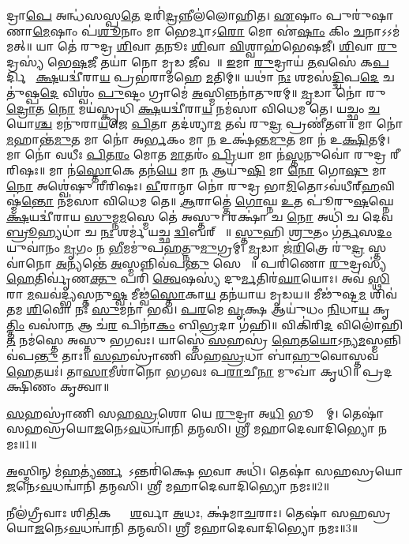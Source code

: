 𑌦𑍍𑌰𑌾\ul{𑌪𑍇} 𑌅𑌨𑍍𑌧॑𑌸𑌸𑍍𑌪\ul{𑌤𑍇} 𑌦𑌰𑌿॑\ul{𑌦𑍍𑌰}𑌨𑍍𑌨𑍀𑌲॑𑌲𑍋𑌹𑌿𑌤। \ul{𑌏}𑌷𑌾𑌂 𑌪𑍁𑌰𑍁॑𑌷𑌾𑌣𑌾\ul{𑌮𑍇}𑌷𑌾𑌂 𑌪॑\ul{𑌶𑍂}𑌨𑌾𑌂 𑌮𑌾 𑌭𑍇𑌰𑍍𑌮𑌾𑌽\ul{𑌰𑍋} 𑌮𑍋 𑌏॑\ul{𑌷𑌾𑌂} 𑌕𑌿𑌂 \ul{𑌚}𑌨𑌾𑌽𑌽𑌮॑𑌮𑌤𑍍॥ 𑌯𑌾 𑌤𑍇॑ 𑌰𑍁𑌦𑍍𑌰 \ul{𑌶𑌿}𑌵𑌾 \ul{𑌤}𑌨𑍂𑌃 \ul{𑌶𑌿}𑌵𑌾 \ul{𑌵𑌿}𑌶𑍍𑌵𑌾𑌹॑𑌭𑍇𑌷𑌜𑍀। \ul{𑌶𑌿}𑌵𑌾 \ul{𑌰𑍁}𑌦𑍍𑌰𑌸𑍍𑌯॑ 𑌭𑍇\ul{𑌷}𑌜𑍀 𑌤𑌯𑌾॑ 𑌨𑍋 𑌮𑍃𑌡 \ul{𑌜𑍀}𑌵𑌸𑍇᳚॥ \ul{𑌇}𑌮𑌾 \ul{𑌰𑍁}𑌦𑍍𑌰𑌾𑌯॑ \ul{𑌤}𑌵𑌸𑍇॑ 𑌕\ul{𑌪}𑌰𑍍𑌦𑌿𑌨𑍇᳚ \ul{𑌕𑍍𑌷}𑌯𑌦𑍍𑌵𑍀॑𑌰𑌾\ul{𑌯} 𑌪𑍍𑌰𑌭॑𑌰𑌾𑌮𑌹𑍇 \ul{𑌮}𑌤𑌿𑌮𑍍॥ 𑌯𑌥𑌾॑ \ul{𑌨𑌃} 𑌶𑌮𑌸॑\ul{𑌦𑍍𑌦𑍍𑌵𑌿}𑌪\ul{𑌦𑍇} 𑌚𑌤𑍁॑𑌷𑍍𑌪\ul{𑌦𑍇} 𑌵𑌿𑌶𑍍𑌵𑌂॑ \ul{𑌪𑍁}𑌷𑍍𑌟𑌂 𑌗𑍍𑌰𑌾𑌮𑍇॑ \ul{𑌅}𑌸𑍍𑌮𑌿𑌨𑍍𑌨𑌨𑌾॑𑌤𑍁𑌰𑌮𑍍॥ \ul{𑌮𑍃}𑌡𑌾 𑌨𑍋॑ 𑌰𑍁\ul{𑌦𑍍𑌰𑍋}𑌤 \ul{𑌨𑍋} 𑌮𑌯॑𑌸𑍍𑌕𑍃𑌧𑌿 \ul{𑌕𑍍𑌷}𑌯𑌦𑍍𑌵𑍀॑𑌰𑌾\ul{𑌯} 𑌨𑌮॑𑌸𑌾 𑌵𑌿𑌧𑍇𑌮 𑌤𑍇। 𑌯𑌚𑍍𑌛𑌂 \ul{𑌚} 𑌯𑍋\ul{𑌶𑍍𑌚} 𑌮𑌨𑍁॑𑌰𑌾\ul{𑌯}𑌜𑍇 \ul{𑌪𑌿}𑌤𑌾 𑌤𑌦॑𑌶𑍍𑌯𑌾\ul{𑌮} 𑌤𑌵॑ 𑌰𑍁\ul{𑌦𑍍𑌰} 𑌪𑍍𑌰𑌣𑍀॑𑌤𑍗॥ 𑌮𑌾 𑌨𑍋॑ \ul{𑌮}𑌹𑌾𑌨𑍍𑌤॑\ul{𑌮𑍁}𑌤 𑌮𑌾 𑌨𑍋॑ 𑌅\ul{𑌰𑍍𑌭}𑌕𑌂 𑌮𑌾 \ul{𑌨} 𑌉𑌕𑍍𑌷॑𑌨𑍍𑌤\ul{𑌮𑍁}𑌤 𑌮𑌾 𑌨॑ 𑌉\ul{𑌕𑍍𑌷𑌿}𑌤𑌮𑍍। 𑌮𑌾 𑌨𑍋॑ 𑌵𑌧𑍀𑌃 \ul{𑌪𑌿}𑌤\ul{𑌰𑌂} 𑌮𑍋𑌤 \ul{𑌮𑌾}𑌤𑌰𑌂॑ \ul{𑌪𑍍𑌰𑌿}𑌯𑌾 𑌮𑌾 𑌨॑\ul{𑌸𑍍𑌤}𑌨𑍁𑌵𑍋॑ 𑌰𑍁𑌦𑍍𑌰 𑌰𑍀𑌰𑌿𑌷𑌃॥ 𑌮𑌾 𑌨॑\ul{𑌸𑍍𑌤𑍋}𑌕𑍇 𑌤𑌨॑\ul{𑌯𑍇} 𑌮𑌾 \ul{𑌨} 𑌆𑌯𑍁॑\ul{𑌷𑌿} 𑌮𑌾 \ul{𑌨𑍋} 𑌗𑍋\ul{𑌷𑍁} 𑌮𑌾 \ul{𑌨𑍋} 𑌅𑌶𑍍𑌵𑍇॑𑌷𑍁 𑌰𑍀𑌰𑌿𑌷𑌃। \ul{𑌵𑍀}𑌰𑌾𑌨𑍍𑌮𑌾 𑌨𑍋॑ 𑌰𑍁𑌦𑍍𑌰 𑌭𑌾\ul{𑌮𑌿}𑌤𑍋𑌽𑌵॑𑌧𑍀𑌰𑍍‌\ul{𑌹}𑌵𑌿𑌷𑍍𑌮॑\ul{𑌨𑍍𑌤𑍋} 𑌨𑌮॑𑌸𑌾 𑌵𑌿𑌧𑍇𑌮 𑌤𑍇॥ \ul{𑌆}𑌰𑌾𑌤𑍍𑌤𑍇॑ \ul{𑌗𑍋}𑌘𑍍𑌨 \ul{𑌉}𑌤 𑌪𑍂॑𑌰𑍁\ul{𑌷}𑌘𑍍𑌨𑍇 \ul{𑌕𑍍𑌷}𑌯𑌦𑍍𑌵𑍀॑𑌰𑌾𑌯 \ul{𑌸𑍁}𑌮𑍍𑌨\ul{𑌮}𑌸𑍍𑌮𑍇 𑌤𑍇॑ 𑌅𑌸𑍍𑌤𑍁। 𑌰𑌕𑍍𑌷𑌾॑ 𑌚 \ul{𑌨𑍋} 𑌅𑌧𑌿॑ 𑌚 𑌦𑍇𑌵 \ul{𑌬𑍍𑌰𑍂}𑌹𑍍𑌯𑌧𑌾॑ 𑌚 \ul{𑌨𑌃} 𑌶𑌰𑍍𑌮॑ 𑌯𑌚𑍍𑌛 \ul{𑌦𑍍𑌵𑌿}𑌬𑌰𑍍‌𑌹𑌾𑌃᳚॥ \ul{𑌸𑍍𑌤𑍁}𑌹𑌿 \ul{𑌶𑍍𑌰𑍁}𑌤𑌂 𑌗॑\ul{𑌰𑍍𑌤}𑌸\ul{𑌦𑌂} 𑌯𑍁𑌵𑌾॑𑌨𑌂 \ul{𑌮𑍃}𑌗𑌂 𑌨 \ul{𑌭𑍀}𑌮𑌮𑍁॑𑌪\ul{𑌹}𑌤𑍍𑌨𑍁\ul{𑌮𑍁}𑌗𑍍𑌰𑌮𑍍। \ul{𑌮𑍃}𑌡𑌾 𑌜॑\ul{𑌰𑌿}𑌤𑍍𑌰𑍇 𑌰𑍁॑\ul{𑌦𑍍𑌰} 𑌸𑍍𑌤𑌵𑌾॑𑌨𑍋 \ul{𑌅}𑌨𑍍𑌯𑌨𑍍𑌤𑍇॑ \ul{𑌅}𑌸𑍍𑌮𑌨𑍍𑌨𑌿𑌵॑𑌪\ul{𑌨𑍍𑌤𑍁} 𑌸𑍇𑌨𑌾𑌃᳚॥ 𑌪𑌰𑌿॑𑌣𑍋 \ul{𑌰𑍁}𑌦𑍍𑌰𑌸𑍍𑌯॑ \ul{𑌹𑍇}𑌤𑌿𑌰𑍍𑌵𑍃॑𑌣\ul{𑌕𑍍𑌤𑍁} 𑌪𑌰𑌿॑ \ul{𑌤𑍍𑌵𑍇}𑌷𑌸𑍍𑌯॑ 𑌦𑍁\ul{𑌰𑍍𑌮}𑌤𑌿𑌰॑\ul{𑌘𑌾}𑌯𑍋𑌃। 𑌅𑌵॑ \ul{𑌸𑍍𑌥𑌿}𑌰𑌾 \ul{𑌮}𑌘𑌵॑𑌦𑍍𑌭𑍍𑌯𑌸𑍍𑌤𑌨𑍁\ul{𑌷𑍍𑌵} 𑌮𑍀𑌢𑍍𑌵॑\ul{𑌸𑍍𑌤𑍋}𑌕𑌾\ul{𑌯} 𑌤𑌨॑𑌯𑌾𑌯 𑌮𑍃𑌡𑌯॥ 𑌮𑍀𑌢𑍁॑𑌷𑍍𑌟\ul{𑌮} 𑌶𑌿𑌵॑𑌤𑌮 \ul{𑌶𑌿}𑌵𑍋 𑌨𑌃॑ \ul{𑌸𑍁}𑌮𑌨𑌾॑ 𑌭𑌵। \ul{𑌪}\ul{𑌰}𑌮𑍇 \ul{𑌵𑍃}𑌕𑍍𑌷 𑌆𑌯𑍁॑𑌧𑌂 \ul{𑌨𑌿}𑌧𑌾\ul{𑌯} 𑌕𑍃\ul{𑌤𑍍𑌤𑌿𑌂} 𑌵𑌸𑌾॑\ul{𑌨} 𑌆 𑌚॑\ul{𑌰} 𑌪𑌿𑌨𑌾॑\ul{𑌕𑌂} 𑌬𑌿\ul{𑌭𑍍𑌰}𑌦𑌾 𑌗॑𑌹𑌿॥ 𑌵𑌿𑌕𑌿॑𑌰𑌿\ul{𑌦} 𑌵𑌿𑌲𑍋॑𑌹𑌿\ul{𑌤} 𑌨𑌮॑𑌸𑍍𑌤𑍇 𑌅𑌸𑍍𑌤𑍁 𑌭𑌗𑌵𑌃। 𑌯𑌾𑌸𑍍𑌤𑍇॑ \ul{𑌸}𑌹𑌸𑍍𑌰॑ \ul{𑌹𑍇}𑌤\ul{𑌯𑍋}𑌽𑌨𑍍𑌯\ul{𑌮}𑌸𑍍𑌮𑌨𑍍𑌨𑌿𑌵॑𑌪\ul{𑌨𑍍𑌤𑍁} 𑌤𑌾𑌃॥ \ul{𑌸}𑌹𑌸𑍍𑌰𑌾॑𑌣𑌿 𑌸𑌹\ul{𑌸𑍍𑌰}𑌧𑌾 𑌬𑌾॑\ul{𑌹𑍁}𑌵𑍋𑌸𑍍𑌤𑌵॑ \ul{𑌹𑍇}𑌤𑌯𑌃॑। 𑌤𑌾\ul{𑌸𑌾}𑌮𑍀𑌶𑌾॑𑌨𑍋 𑌭𑌗𑌵𑌃 𑌪\ul{𑌰𑌾}𑌚𑍀\ul{𑌨𑌾} 𑌮𑍁𑌖𑌾॑ 𑌕𑍃𑌧𑌿॥
𑌪𑍍𑌰𑌦𑌕𑍍𑌷𑌿𑌣𑌂 𑌕𑍃𑌤𑍍𑌵𑌾॥


{\small \closesection}



\ul{𑌸}𑌹𑌸𑍍𑌰𑌾॑𑌣𑌿 𑌸𑌹\ul{𑌸𑍍𑌰}𑌶𑍋 𑌯𑍇 \ul{𑌰𑍁}𑌦𑍍𑌰𑌾 𑌅\ul{𑌧𑌿} 𑌭𑍂𑌮𑍍𑌯𑌾᳚𑌮𑍍। 𑌤𑍇𑌷𑌾॑ 𑌸𑌹𑌸𑍍𑌰𑌯𑍋\ul{𑌜}𑌨𑍇\-𑌽\ul{𑌵}𑌧𑌨𑍍𑌵𑌾॑𑌨𑌿 𑌤𑌨𑍍𑌮𑌸𑌿। 𑌶𑍍𑌰𑍀 𑌮𑌹𑌾𑌦𑍇𑌵𑌾𑌦𑌿𑌭𑍍𑌯𑍋 𑌨𑌮𑌃॥1॥

\ul{𑌅}𑌸𑍍𑌮𑌿𑌨𑍍 𑌮॑\ul{𑌹}𑌤𑍍𑌯॑\ul{𑌰𑍍𑌣}𑌵𑍇᳚𑌽𑌨𑍍𑌤𑌰𑌿॑𑌕𑍍𑌷𑍇 \ul{𑌭}𑌵𑌾 𑌅𑌧𑌿॑। 𑌤𑍇𑌷𑌾॑ 𑌸𑌹𑌸𑍍𑌰𑌯𑍋\ul{𑌜}𑌨𑍇\-𑌽\ul{𑌵}𑌧𑌨𑍍𑌵𑌾॑𑌨𑌿 𑌤𑌨𑍍𑌮𑌸𑌿। 𑌶𑍍𑌰𑍀 𑌮𑌹𑌾𑌦𑍇𑌵𑌾𑌦𑌿𑌭𑍍𑌯𑍋 𑌨𑌮𑌃॥2॥

𑌨𑍀𑌲॑𑌗𑍍𑌰𑍀𑌵𑌾𑌃 𑌶𑌿\ul{𑌤𑌿}𑌕𑌣𑍍𑌠𑌾𑌃᳚ \ul{𑌶}𑌰𑍍𑌵𑌾 \ul{𑌅}𑌧𑌃, 𑌕𑍍𑌷॑𑌮𑌾\ul{𑌚}𑌰𑌾𑌃। 𑌤𑍇𑌷𑌾॑ 𑌸𑌹𑌸𑍍𑌰𑌯𑍋\ul{𑌜}𑌨𑍇\-𑌽\ul{𑌵}𑌧𑌨𑍍𑌵𑌾॑𑌨𑌿 𑌤𑌨𑍍𑌮𑌸𑌿। 𑌶𑍍𑌰𑍀 𑌮𑌹𑌾𑌦𑍇𑌵𑌾𑌦𑌿𑌭𑍍𑌯𑍋 𑌨𑌮𑌃॥3॥

